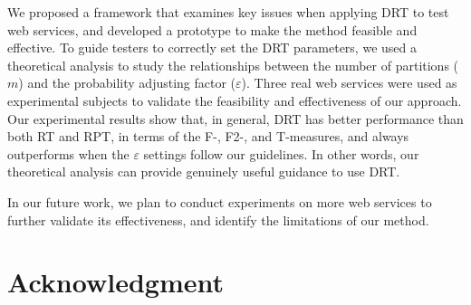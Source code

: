 \documentclass[10pt,journal,compsoc]{IEEEtran}
\begin{document}
We proposed a framework that examines key issues when applying DRT to test web services, and developed a prototype to make the method  feasible and effective.
To guide testers to correctly set the DRT parameters, we used a theoretical analysis to study the relationships between the number of partitions ($m$) and the probability adjusting factor ($\varepsilon$).
Three real web services were used as experimental subjects to validate the feasibility and effectiveness of our approach.
Our experimental results show that, in general, DRT has better performance than both RT and RPT, in terms of the F-, F2-, and T-measures, and always outperforms when the $\varepsilon$ settings follow our guidelines.
In other words, our theoretical analysis can provide genuinely useful guidance to use DRT.

In our future work, we plan to conduct experiments on more web services to further validate its effectiveness, and identify the limitations of our method.

\section*{Acknowledgment}
\end{document}
